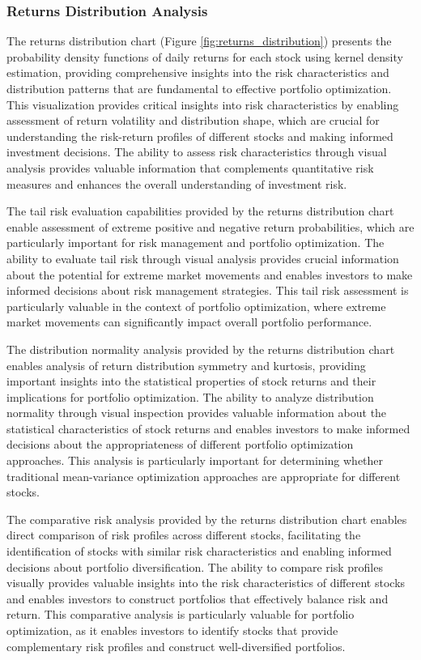\documentclass[12pt,a4paper]{article}
\begin{document}
\subsubsection{Returns Distribution Analysis}

The returns distribution chart (Figure \ref{fig:returns_distribution}) presents the probability density functions of daily returns for each stock using kernel density estimation, providing comprehensive insights into the risk characteristics and distribution patterns that are fundamental to effective portfolio optimization. This visualization provides critical insights into risk characteristics by enabling assessment of return volatility and distribution shape, which are crucial for understanding the risk-return profiles of different stocks and making informed investment decisions. The ability to assess risk characteristics through visual analysis provides valuable information that complements quantitative risk measures and enhances the overall understanding of investment risk.

The tail risk evaluation capabilities provided by the returns distribution chart enable assessment of extreme positive and negative return probabilities, which are particularly important for risk management and portfolio optimization. The ability to evaluate tail risk through visual analysis provides crucial information about the potential for extreme market movements and enables investors to make informed decisions about risk management strategies. This tail risk assessment is particularly valuable in the context of portfolio optimization, where extreme market movements can significantly impact overall portfolio performance.

The distribution normality analysis provided by the returns distribution chart enables analysis of return distribution symmetry and kurtosis, providing important insights into the statistical properties of stock returns and their implications for portfolio optimization. The ability to analyze distribution normality through visual inspection provides valuable information about the statistical characteristics of stock returns and enables investors to make informed decisions about the appropriateness of different portfolio optimization approaches. This analysis is particularly important for determining whether traditional mean-variance optimization approaches are appropriate for different stocks.

The comparative risk analysis provided by the returns distribution chart enables direct comparison of risk profiles across different stocks, facilitating the identification of stocks with similar risk characteristics and enabling informed decisions about portfolio diversification. The ability to compare risk profiles visually provides valuable insights into the risk characteristics of different stocks and enables investors to construct portfolios that effectively balance risk and return. This comparative analysis is particularly valuable for portfolio optimization, as it enables investors to identify stocks that provide complementary risk profiles and construct well-diversified portfolios.
\end{document}
